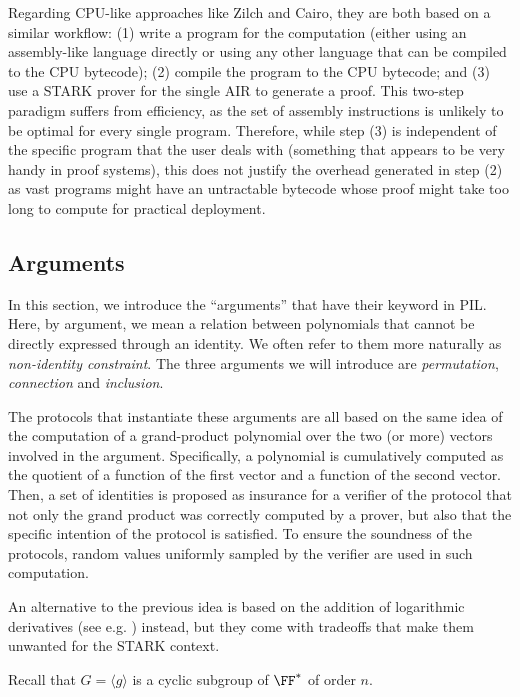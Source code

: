 Regarding CPU-like approaches like Zilch and Cairo, they are both based on a similar workflow: (1) write a program for the computation (either using an assembly-like language directly or using any other language that can be compiled to the CPU bytecode); (2) compile the program to the CPU bytecode; and (3) use a STARK prover for the single AIR to generate a proof. This two-step paradigm suffers from efficiency, as the set of assembly instructions is unlikely to be optimal for every single program. Therefore, while step (3) is independent of the specific program that the user deals with (something that appears to be very handy in proof systems), this does not justify the overhead generated in step (2) as vast programs might have an untractable bytecode whose proof might take too long to compute for practical deployment.


\subsection{Arguments}\label{sec:preliminaries:arguments}

In this section, we introduce the ``arguments'' that have their keyword in PIL. Here, by argument, we mean a relation between polynomials that cannot be directly expressed through an identity. We often refer to them more naturally as \textit{non-identity constraint}. The three arguments we will introduce are \textit{permutation}, \textit{connection} and \textit{inclusion}.

The protocols that instantiate these arguments are all based on the same idea of the computation of a grand-product polynomial over the two (or more) vectors involved in the argument. Specifically, a polynomial is cumulatively computed as the quotient of a function of the first vector and a function of the second vector. Then, a set of identities is proposed as insurance for a verifier of the protocol that not only the grand product was correctly computed by a prover, but also that the specific intention of the protocol is satisfied. To ensure the soundness of the protocols, random values uniformly sampled by the verifier are used in such computation.

An alternative to the previous idea is based on the addition of logarithmic derivatives (see e.g. \cite{EPRINT:Habock22M}) instead, but they come with tradeoffs that make them unwanted for the STARK context. 

Recall that $G = \langle g \rangle$ is a cyclic subgroup of $\FF^*$ of order $n$.

